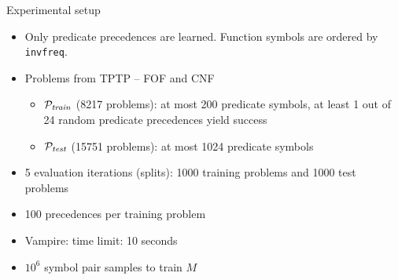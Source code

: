 \documentclass[notes]{beamer}
\begin{document}
\begin{frame}[noframenumbering]{Experimental setup}
\begin{itemize}
	\item Only predicate precedences are learned.
	Function symbols are ordered by \texttt{invfreq}.
	\item Problems from TPTP \cite{Sut17} -- FOF and CNF
	\begin{itemize}
		\item $\mathcal{P}_{\mathit{train}}$ (8217 problems):
		at most 200 predicate symbols,
		at least 1 out of 24 random predicate precedences yield success
		\item $\mathcal{P}_{\mathit{test}}$ (15751 problems):
		at most 1024 predicate symbols
	\end{itemize}
	\item 5 evaluation iterations (splits): 1000 training problems and 1000 test problems
	\item 100 precedences per training problem
	\item Vampire: time limit: 10 seconds
	\item $10^6$ symbol pair samples to train $M$
\end{itemize}
\end{frame}
\end{document}
